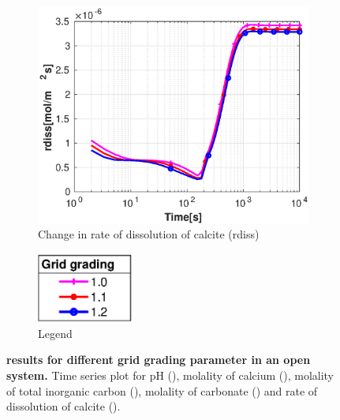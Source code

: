 \begin{figure}[!h]
\begin{subfigure}{.5\linewidth}
        \label{fig:gridmCO3}
    \end{subfigure}%
        \hfill
        \begin{subfigure}{.5\linewidth}
            \centering
        \includegraphics[width=\textwidth]{PICTURES/with_grid_rdiss.eps}
        \caption{\small Change in rate of dissolution of calcite (rdiss)}
        \label{fig:gridrdiss}
    \end{subfigure}%
        \hfill
        \begin{subfigure}{.5\linewidth}
            \centering
        \includegraphics[width=0.35\textwidth]{PICTURES/with_grid_legend.eps}
        \caption{\small Legend}
        \label{fig:gridlegend}
    \end{subfigure}%
    \caption [\DuMuX results for different grid grading parameter in an open system.] {\textbf{\DuMuX results for 
    different grid grading parameter in an open system.} \small Time series plot for pH (), 
    molality of calcium (), 
    molality of total inorganic carbon (), molality of carbonate () 
    and rate of dissolution of calcite ().}
    \label{fig:diffGrid}
\end{figure}

